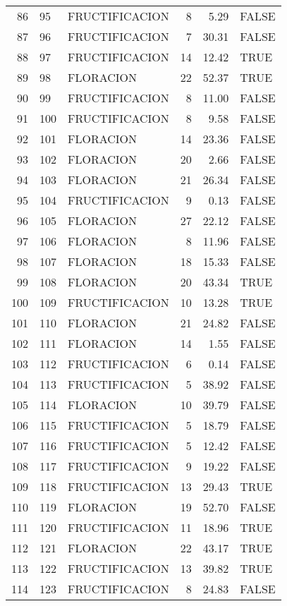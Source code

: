 \begin{table}[ht]
\begin{tabular}{rllrrl}
  86 & 95 & FRUCTIFICACION &   8 & 5.29 & FALSE \\ 
  87 & 96 & FRUCTIFICACION &   7 & 30.31 & FALSE \\ 
  88 & 97 & FRUCTIFICACION &  14 & 12.42 & TRUE \\ 
  89 & 98 & FLORACION &  22 & 52.37 & TRUE \\ 
  90 & 99 & FRUCTIFICACION &   8 & 11.00 & FALSE \\ 
  91 & 100 & FRUCTIFICACION &   8 & 9.58 & FALSE \\ 
  92 & 101 & FLORACION &  14 & 23.36 & FALSE \\ 
  93 & 102 & FLORACION &  20 & 2.66 & FALSE \\ 
  94 & 103 & FLORACION &  21 & 26.34 & FALSE \\ 
  95 & 104 & FRUCTIFICACION &   9 & 0.13 & FALSE \\ 
  96 & 105 & FLORACION &  27 & 22.12 & FALSE \\ 
  97 & 106 & FLORACION &   8 & 11.96 & FALSE \\ 
  98 & 107 & FLORACION &  18 & 15.33 & FALSE \\ 
  99 & 108 & FLORACION &  20 & 43.34 & TRUE \\ 
  100 & 109 & FRUCTIFICACION &  10 & 13.28 & TRUE \\ 
  101 & 110 & FLORACION &  21 & 24.82 & FALSE \\ 
  102 & 111 & FLORACION &  14 & 1.55 & FALSE \\ 
  103 & 112 & FRUCTIFICACION &   6 & 0.14 & FALSE \\ 
  104 & 113 & FRUCTIFICACION &   5 & 38.92 & FALSE \\ 
  105 & 114 & FLORACION &  10 & 39.79 & FALSE \\ 
  106 & 115 & FRUCTIFICACION &   5 & 18.79 & FALSE \\ 
  107 & 116 & FRUCTIFICACION &   5 & 12.42 & FALSE \\ 
  108 & 117 & FRUCTIFICACION &   9 & 19.22 & FALSE \\ 
  109 & 118 & FRUCTIFICACION &  13 & 29.43 & TRUE \\ 
  110 & 119 & FLORACION &  19 & 52.70 & FALSE \\ 
  111 & 120 & FRUCTIFICACION &  11 & 18.96 & TRUE \\ 
  112 & 121 & FLORACION &  22 & 43.17 & TRUE \\ 
  113 & 122 & FRUCTIFICACION &  13 & 39.82 & TRUE \\ 
  114 & 123 & FRUCTIFICACION &   8 & 24.83 & FALSE \\ 

\end{tabular}
\end{table}
